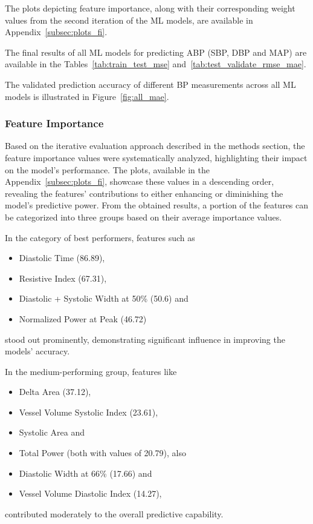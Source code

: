 The plots depicting feature importance, along with their corresponding weight values from the second iteration of the ML models, are available in Appendix~\ref{subsec:plots_fi}.

The final results of all ML models for predicting ABP (SBP, DBP and MAP) are available in the Tables~\ref{tab:train_test_mse} and~\ref{tab:test_validate_rmse_mae}.

The validated prediction accuracy of different BP measurements across all ML models is illustrated in Figure~\ref{fig:all_mae}.

\subsubsection{Feature Importance}
\label{subsubsec:feature_importance}

Based on the iterative evaluation approach described in the methods section, the feature importance values were systematically analyzed, highlighting their impact on the model's performance.
The plots, available in the Appendix~\ref{subsec:plots_fi}, showcase these values in a descending order, revealing the features' contributions to either enhancing or diminishing the model's predictive power.
From the obtained results, a portion of the features can be categorized into three groups based on their average importance values.

In the category of best performers, features such as
\begin{itemize}
    \item Diastolic Time (86.89),
    \item Resistive Index (67.31),
    \item Diastolic + Systolic Width at 50\% (50.6) and
    \item Normalized Power at Peak (46.72)
\end{itemize}
stood out prominently, demonstrating significant influence in improving the models' accuracy.

In the medium-performing group, features like
\begin{itemize}
    \item Delta Area (37.12),
    \item Vessel Volume Systolic Index (23.61),
    \item Systolic Area and
    \item Total Power (both with values of 20.79), also
    \item Diastolic Width at 66\% (17.66) and
    \item Vessel Volume Diastolic Index (14.27),
\end{itemize}
contributed moderately to the overall predictive capability.

